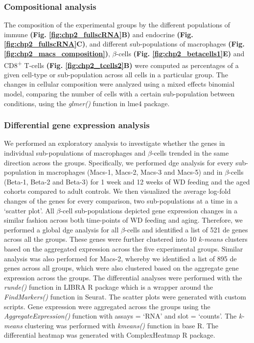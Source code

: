 \subsubsection{\large Compositional analysis}
The composition of the experimental groups by the different populations of immune \textbf{(Fig. \ref{fig:chp2_fullscRNA}B)} and endocrine \textbf{(Fig. \ref{fig:chp2_fullscRNA}C)}, and different sub-populations of macrophages \textbf{(Fig. \ref{fig:chp2_macs_composition})}, $\beta$-cells \textbf{(Fig. \ref{fig:chp2_betacells1}E)} and CD8\textsuperscript{+} T-cells \textbf{(Fig. \ref{fig:chp2_tcells2}B)} were computed as percentages of a given cell-type or sub-population across all cells in a particular group. The changes in cellular composition were analyzed using a mixed effects binomial model, comparing the number of cells with a certain sub-population between conditions, using the \textit{glmer()} function in lme4 package.

\subsubsection{\large Differential gene expression analysis}
We performed an exploratory analysis to investigate whether the genes in individual sub-populations of macrophages and $\beta$-cells trended in the same direction across the groups. Specifically, we performed \gls{dge} analysis for every sub-population in macrophages (Macs-1, Macs-2, Macs-3 and Macs-5) and in $\beta$-cells (Beta-1, Beta-2 and Beta-3) for 1 week and 12 weeks of WD feeding and the aged cohorts compared to adult controls. We then visualized the average log-fold changes of the genes for every comparison, two sub-populations at a time in a `scatter plot'. All $\beta$-cell sub-populations depicted gene expression changes in a similar fashion across both time-points of WD feeding and aging. Therefore, we performed a global \gls{dge} analysis for all $\beta$-cells and identified a list of 521 \gls{de} genes across all the groups. These genes were further clustered into 10 \textit{k-means} clusters based on the aggregated expression across the five experimental groups. Similar analysis was also performed for Macs-2, whereby we identified a list of 895 \gls{de} genes across all groups, which were also clustered based on the aggregate gene expression across the groups. The differential analyses were performed with the \textit{run\textunderscore de()} function in LIBRA R package \textbf{\cite{}} which is a wrapper around the \textit{FindMarkers()} function in Seurat. The scatter plots were generated with custom scripts. Gene expression were aggregated across the groups using the \textit{AggregateExpression()} function with assays = ‘RNA’ and slot = ‘counts’. The \textit{k-means} clustering was performed with \textit{kmeans()} function in base R. The differential heatmap was generated with ComplexHeatmap R package.

